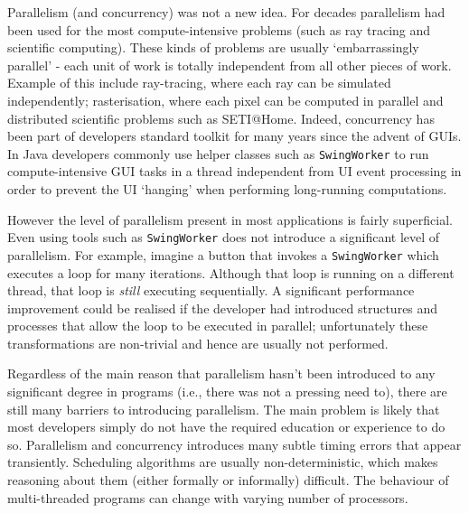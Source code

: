 Parallelism (and concurrency) was not a new idea. For decades parallelism had been used for the most compute-intensive problems (such as ray tracing and scientific computing). These kinds of problems are usually `embarrassingly parallel' - each unit of work is totally independent from all other pieces of work. Example of this include ray-tracing, where each ray can be simulated independently; rasterisation, where each pixel can be computed in parallel and distributed scientific problems such as SETI@Home. Indeed, concurrency has been part of developers standard toolkit for many years since the advent of GUIs. In Java developers commonly use helper classes such as \texttt{SwingWorker} to run compute-intensive GUI tasks in a thread independent from UI event processing in order to prevent the UI `hanging' when performing long-running computations.

However the level of parallelism present in most applications is fairly superficial. Even using tools such as \texttt{SwingWorker} does not introduce a significant level of parallelism. For example, imagine a button that invokes a \texttt{SwingWorker} which executes a loop for many iterations. Although that loop is running on a different thread, that loop is \textit{still} executing sequentially. A significant performance improvement could be realised if the developer had introduced structures and  processes that allow the loop to be executed in parallel; unfortunately these transformations are non-trivial and hence are usually not performed.

Regardless of the main reason that parallelism hasn't been introduced to any significant degree in programs (i.e., there was not a pressing need to), there are still many barriers to introducing parallelism. The main problem is likely that most developers simply do not have the required education or experience to do so. Parallelism and concurrency introduces many subtle timing errors that appear transiently. Scheduling algorithms are usually non-deterministic, which makes reasoning about them (either formally or informally) difficult. The behaviour of multi-threaded programs can change with varying number of processors.

